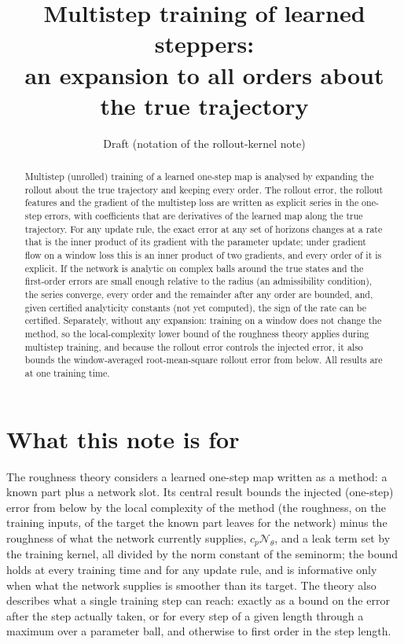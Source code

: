 \documentclass[11pt]{article}
\title{Multistep training of learned steppers:\\ an expansion to all orders about the true trajectory}
\author{Draft (notation of the rollout-kernel note)}
\date{}
\theoremstyle{definition}
\theoremstyle{remark}
\newcommand{\Nn}{\mathcal N_\theta}
\begin{document}
\maketitle

\begin{abstract}
Multistep (unrolled) training of a learned one-step map is analysed by expanding the rollout about the true trajectory and keeping every order.
The rollout error, the rollout features and the gradient of the multistep loss are written as explicit series in the one-step errors, with coefficients that are derivatives of the learned map along the true trajectory.
For any update rule, the exact error at any set of horizons changes at a rate that is the inner product of its gradient with the parameter update; under gradient flow on a window loss this is an inner product of two gradients, and every order of it is explicit.
If the network is analytic on complex balls around the true states and the first-order errors are small enough relative to the radius (an admissibility condition), the series converge, every order and the remainder after any order are bounded, and, given certified analyticity constants (not yet computed), the sign of the rate can be certified.
Separately, without any expansion: training on a window does not change the method, so the local-complexity lower bound of the roughness theory applies during multistep training, and because the rollout error controls the injected error, it also bounds the window-averaged root-mean-square rollout error from below.
All results are at one training time.
\end{abstract}

\section{What this note is for}\label{sec:purpose}

The roughness theory considers a learned one-step map written as a method: a known part plus a network slot.
Its central result bounds the injected (one-step) error from below by the local complexity of the method (the roughness, on the training inputs, of the target the known part leaves for the network) minus the roughness of what the network currently supplies, $c_p\Nn$, and a leak term set by the training kernel, all divided by the norm constant of the seminorm; the bound holds at every training time and for any update rule, and is informative only when what the network supplies is smoother than its target.
The theory also describes what a single training step can reach: exactly as a bound on the error after the step actually taken, or for every step of a given length through a maximum over a parameter ball, and otherwise to first order in the step length.
\end{document}
